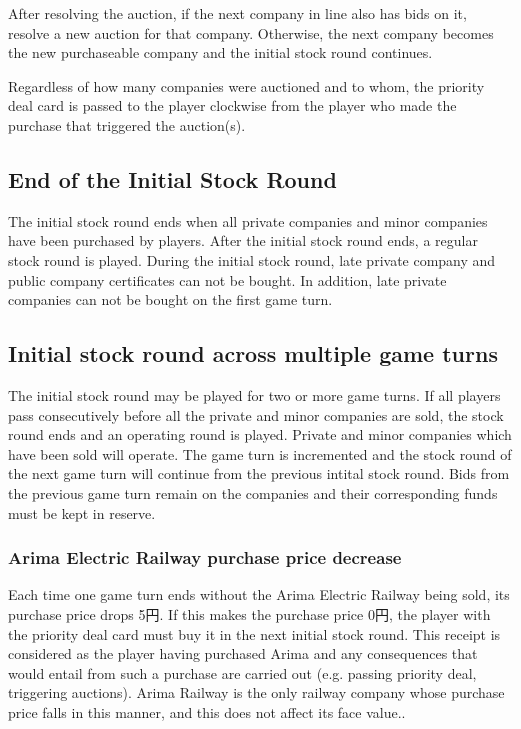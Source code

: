 \documentclass{article}
\begin{document}
\begin{CJK}{UTF8}{min}
\begin{multicols}{2}
After resolving the auction, if the next company in line also has bids
on it, resolve a new auction for that company. Otherwise, the next
company becomes the new purchaseable company and the initial stock
round continues.

Regardless of how many companies were auctioned and to whom, the
priority deal card is passed to the player clockwise from the player
who made the purchase that triggered the auction(s).

\subsection{End of the Initial Stock Round}
The initial stock round ends when all private companies and minor
companies have been purchased by players. After the initial stock
round ends, a regular stock round is played. During the initial stock
round, late private company and public company certificates can not be
bought. In addition, late private companies can not be bought on the
first game turn.

\subsection{Initial stock round across multiple game turns}
The initial stock round may be played for two or more game turns. If
all players pass consecutively before all the private and minor
companies are sold, the stock round ends and an operating round is
played. Private and minor companies which have been sold will
operate. The game turn is incremented and the stock round of the next
game turn will continue from the previous intital stock round. Bids
from the previous game turn remain on the companies and their corresponding
funds must be kept in reserve.

\subsubsection{Arima Electric Railway purchase price decrease}
\label{isr-arima}
Each time one game turn ends without the Arima Electric Railway being
sold, its purchase price drops 5円. If this makes the purchase
price 0円, the player with the priority deal card must buy it in
the next initial stock round. This receipt is considered as the player
having purchased Arima and any consequences that would entail from
such a purchase are carried out (e.g. passing priority deal, triggering
auctions). Arima Railway is the only railway company whose purchase
price falls in this manner, and this does not affect its face value..


\end{multicols}
\end{CJK}
\end{document}
